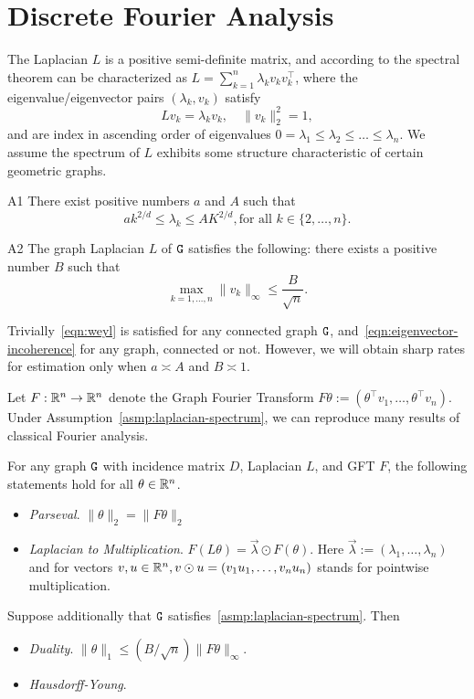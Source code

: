 \documentclass{article}
\begin{document}
	\section{Discrete Fourier Analysis}
	The Laplacian $L$ is a positive semi-definite matrix, and according to the spectral theorem can be characterized as $L = \sum_{k = 1}^{n} \lambda_k v_k v_k^{\top}$, where the eigenvalue/eigenvector pairs $(\lambda_k,v_k)$ satisfy
	\begin{equation}
	L v_k = \lambda_k v_k, \quad \|v_k\|_2^2 = 1,
	\end{equation} 
	and are index in ascending order of eigenvalues $0 = \lambda_1 \leq \lambda_2 \leq \ldots \leq \lambda_n$. We assume the spectrum of $L$ exhibits some structure characteristic of certain geometric graphs.
	\begin{assumption}{A}{1}
		\label{asmp:weyl}
		There exist positive numbers $a$ and $A$ such that
		\begin{equation}
		\label{eqn:weyl}
		a k^{2/d} \leq \lambda_k \leq A K^{2/d}, \textrm{for all $k \in \{2,\ldots,n\}$.}
		\end{equation}
	\end{assumption}
	\begin{assumption}{A}{2}
		\label{asmp:laplacian-spectrum} 
		The graph Laplacian $L$ of $\texttt{G}$ satisfies the following: there exists a positive number $B$ such that
		\begin{equation}
		\label{eqn:eigenvector-incoherence}
		\max_{k = 1,\ldots,n} \|v_k\|_{\infty} \leq \frac{B}{\sqrt{n}}.
		\end{equation}
	\end{assumption}
	Trivially~\eqref{eqn:weyl} is satisfied for any connected graph $\texttt{G}$, and~\eqref{eqn:eigenvector-incoherence} for any graph, connected or not. However, we will obtain sharp rates for estimation only when $a \asymp A$ and $B \asymp 1$. 
	
	Let $F: \mathbb{R}^n \to \mathbb{R}^n$ denote the Graph Fourier Transform $F\theta := (\theta^{\top} v_1,\ldots,\theta^{\top}v_n)$.  Under Assumption~\ref{asmp:laplacian-spectrum}, we can reproduce many results of classical Fourier analysis.
	\begin{proposition}
		For any graph $\texttt{G}$ with incidence matrix $D$, Laplacian $L$, and GFT $F$, the following statements hold for all $\theta \in \mathbb{R}^n$.
		\begin{itemize}
			\item \emph{Parseval}. $\|\theta\|_2 = \|F\theta\|_2$
			\item \emph{Laplacian to Multiplication}. $F(L\theta) = \vec{\lambda} \odot F(\theta)$. Here $\vec{\lambda} := (\lambda_1,\ldots,\lambda_n)$ and for vectors $v,u \in \mathbb{R}^n, v \odot u = (v_1u_1,\ldots,v_nu_n)$ stands for pointwise multiplication.
		\end{itemize}
		Suppose additionally that $\texttt{G}$ satisfies~\ref{asmp:laplacian-spectrum}. Then
		\begin{itemize}
			\item \emph{Duality}. $\|\theta\|_1 \leq (B/\sqrt{n}) \|F\theta\|_{\infty}$.
			\item \emph{Hausdorff-Young}.  
		\end{itemize}
	\end{proposition}
\end{document}

